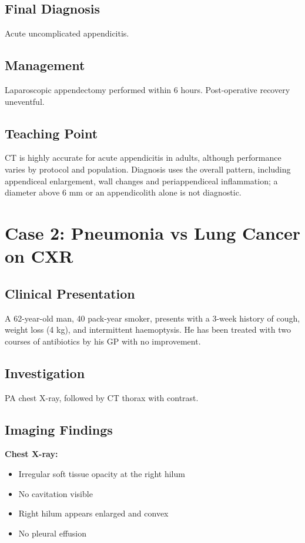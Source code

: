 \subsection{Final Diagnosis}
Acute uncomplicated appendicitis.

\subsection{Management}
Laparoscopic appendectomy performed within 6 hours. Post-operative recovery uneventful.

\subsection{Teaching Point}
CT is highly accurate for acute appendicitis in adults, although performance varies by protocol and population. Diagnosis uses the overall pattern, including appendiceal enlargement, wall changes and periappendiceal inflammation; a diameter above 6 mm or an appendicolith alone is not diagnostic.

\clearpage

\section{Case 2: Pneumonia vs Lung Cancer on CXR}

\subsection{Clinical Presentation}
A 62-year-old man, 40 pack-year smoker, presents with a 3-week history of cough, weight loss (4 kg), and intermittent haemoptysis. He has been treated with two courses of antibiotics by his GP with no improvement.

\subsection{Investigation}
PA chest X-ray, followed by CT thorax with contrast.

\subsection{Imaging Findings}
\textbf{Chest X-ray:}
\begin{itemize}
    \item Irregular soft tissue opacity at the right hilum
    \item No cavitation visible
    \item Right hilum appears enlarged and convex
    \item No pleural effusion
\end{itemize}

